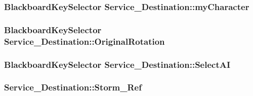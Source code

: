 \subsubsection[{\texorpdfstring{my\+Character}{myCharacter}}]{\setlength{\rightskip}{0pt plus 5cm}Blackboard\+Key\+Selector Service\+\_\+\+Destination\+::my\+Character}\hypertarget{class_service___destination_aa01c366172f8b80aade716cba21820b1}{}\label{class_service___destination_aa01c366172f8b80aade716cba21820b1}
\subsubsection[{\texorpdfstring{Original\+Rotation}{OriginalRotation}}]{\setlength{\rightskip}{0pt plus 5cm}Blackboard\+Key\+Selector Service\+\_\+\+Destination\+::\+Original\+Rotation}\hypertarget{class_service___destination_adb4d684a452e88b7bbf0a1ece04f21e1}{}\label{class_service___destination_adb4d684a452e88b7bbf0a1ece04f21e1}
\subsubsection[{\texorpdfstring{Select\+AI}{SelectAI}}]{\setlength{\rightskip}{0pt plus 5cm}Blackboard\+Key\+Selector Service\+\_\+\+Destination\+::\+Select\+AI}\hypertarget{class_service___destination_a3bf42785905cc363414a52b61274b793}{}\label{class_service___destination_a3bf42785905cc363414a52b61274b793}
\subsubsection[{\texorpdfstring{Storm\+\_\+\+Ref}{Storm_Ref}}]{ Service\+\_\+\+Destination\+::\+Storm\+\_\+\+Ref}\hypertarget{class_service___destination_aa76646438b2f815ef439bd27d5514d4b}{}\label{class_service___destination_aa76646438b2f815ef439bd27d5514d4b}
